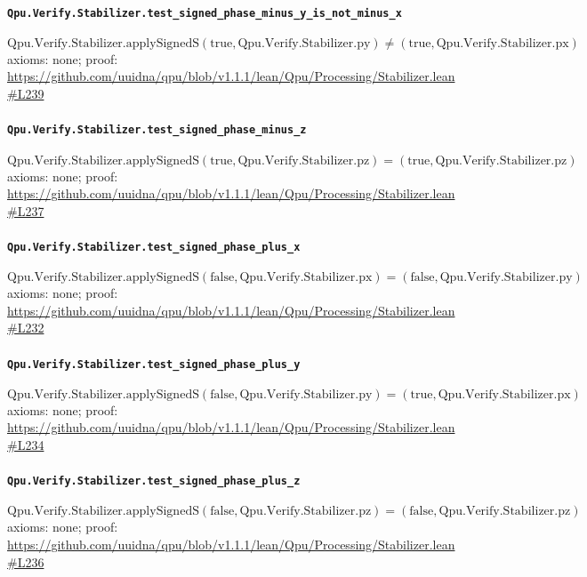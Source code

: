 \documentclass[11pt]{article}
\begin{document}
\paragraph{\texttt{Qpu.Verify.Stabilizer.test\_signed\_phase\_minus\_y\_is\_not\_minus\_x}}
\[ \mathrm{Qpu.Verify.Stabilizer.applySignedS} (\mathrm{true}, \mathrm{Qpu.Verify.Stabilizer.py}) \ne (\mathrm{true}, \mathrm{Qpu.Verify.Stabilizer.px}) \]
\noindent axioms: none; proof: \url{https://github.com/uuidna/qpu/blob/v1.1.1/lean/Qpu/Processing/Stabilizer.lean\#L239}

\paragraph{\texttt{Qpu.Verify.Stabilizer.test\_signed\_phase\_minus\_z}}
\[ \mathrm{Qpu.Verify.Stabilizer.applySignedS} (\mathrm{true}, \mathrm{Qpu.Verify.Stabilizer.pz}) = (\mathrm{true}, \mathrm{Qpu.Verify.Stabilizer.pz}) \]
\noindent axioms: none; proof: \url{https://github.com/uuidna/qpu/blob/v1.1.1/lean/Qpu/Processing/Stabilizer.lean\#L237}

\paragraph{\texttt{Qpu.Verify.Stabilizer.test\_signed\_phase\_plus\_x}}
\[ \mathrm{Qpu.Verify.Stabilizer.applySignedS} (\mathrm{false}, \mathrm{Qpu.Verify.Stabilizer.px}) = (\mathrm{false}, \mathrm{Qpu.Verify.Stabilizer.py}) \]
\noindent axioms: none; proof: \url{https://github.com/uuidna/qpu/blob/v1.1.1/lean/Qpu/Processing/Stabilizer.lean\#L232}

\paragraph{\texttt{Qpu.Verify.Stabilizer.test\_signed\_phase\_plus\_y}}
\[ \mathrm{Qpu.Verify.Stabilizer.applySignedS} (\mathrm{false}, \mathrm{Qpu.Verify.Stabilizer.py}) = (\mathrm{true}, \mathrm{Qpu.Verify.Stabilizer.px}) \]
\noindent axioms: none; proof: \url{https://github.com/uuidna/qpu/blob/v1.1.1/lean/Qpu/Processing/Stabilizer.lean\#L234}

\paragraph{\texttt{Qpu.Verify.Stabilizer.test\_signed\_phase\_plus\_z}}
\[ \mathrm{Qpu.Verify.Stabilizer.applySignedS} (\mathrm{false}, \mathrm{Qpu.Verify.Stabilizer.pz}) = (\mathrm{false}, \mathrm{Qpu.Verify.Stabilizer.pz}) \]
\noindent axioms: none; proof: \url{https://github.com/uuidna/qpu/blob/v1.1.1/lean/Qpu/Processing/Stabilizer.lean\#L236}
\end{document}
